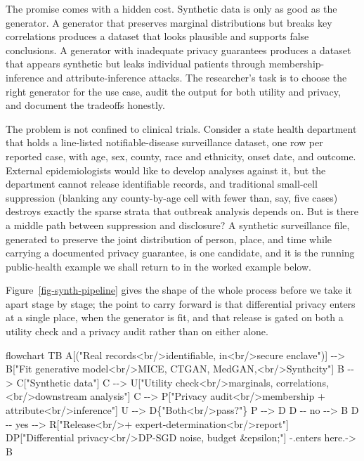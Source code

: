 \documentclass[
  letterpaper,
  11pt]{scrbook}
\newenvironment{Shaded}{\begin{snugshade}}{\end{snugshade}}
\newcommand{\NormalTok}[1]{\textcolor[rgb]{0.00,0.23,0.31}{#1}}
\begin{document}
The promise comes with a hidden cost. Synthetic data is only as good as
the generator. A generator that preserves marginal distributions but
breaks key correlations produces a dataset that looks plausible and
supports false conclusions. A generator with inadequate privacy
guarantees produces a dataset that appears synthetic but leaks
individual patients through membership-inference and attribute-inference
attacks. The researcher's task is to choose the right generator for the
use case, audit the output for both utility and privacy, and document
the tradeoffs honestly.

The problem is not confined to clinical trials. Consider a state health
department that holds a line-listed notifiable-disease surveillance
dataset, one row per reported case, with age, sex, county, race and
ethnicity, onset date, and outcome. External epidemiologists would like
to develop analyses against it, but the department cannot release
identifiable records, and traditional small-cell suppression (blanking
any county-by-age cell with fewer than, say, five cases) destroys
exactly the sparse strata that outbreak analysis depends on. But is
there a middle path between suppression and disclosure? A synthetic
surveillance file, generated to preserve the joint distribution of
person, place, and time while carrying a documented privacy guarantee,
is one candidate, and it is the running public-health example we shall
return to in the worked example below.

Figure~\ref{fig-synth-pipeline} gives the shape of the whole process
before we take it apart stage by stage; the point to carry forward is
that differential privacy enters at a single place, when the generator
is fit, and that release is gated on both a utility check and a privacy
audit rather than on either alone.

\begin{Shaded}
\begin{Highlighting}[]
\NormalTok{flowchart TB}
\NormalTok{  A[("Real records\textless{}br/\textgreater{}identifiable, in\textless{}br/\textgreater{}secure enclave")] {-}{-}\textgreater{} B["Fit generative model\textless{}br/\textgreater{}MICE, CTGAN, MedGAN,\textless{}br/\textgreater{}Synthcity"]}
\NormalTok{  B {-}{-}\textgreater{} C["Synthetic data"]}
\NormalTok{  C {-}{-}\textgreater{} U["Utility check\textless{}br/\textgreater{}marginals, correlations,\textless{}br/\textgreater{}downstream analysis"]}
\NormalTok{  C {-}{-}\textgreater{} P["Privacy audit\textless{}br/\textgreater{}membership + attribute\textless{}br/\textgreater{}inference"]}
\NormalTok{  U {-}{-}\textgreater{} D\{"Both\textless{}br/\textgreater{}pass?"\}}
\NormalTok{  P {-}{-}\textgreater{} D}
\NormalTok{  D {-}{-} no {-}{-}\textgreater{} B}
\NormalTok{  D {-}{-} yes {-}{-}\textgreater{} R["Release\textless{}br/\textgreater{}+ expert{-}determination\textless{}br/\textgreater{}report"]}
\NormalTok{  DP["Differential privacy\textless{}br/\textgreater{}DP{-}SGD noise, budget \&epsilon;"] {-}.enters here.{-}\textgreater{} B}
\end{Highlighting}
\end{Shaded}
\end{document}
